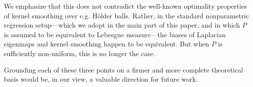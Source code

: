 \begin{itemize}
	We emphasize that this does not contradict the well-known optimality properties of kernel smoothing over e.g. H\"{o}lder balls. Rather, in the standard nonparametric regression setup---which we adopt in the main part of this paper, and in which $P$ is assumed to be equivalent to Lebesgue measure---the biases of Laplacian eigenmaps and kernel smoothing happen to be equivalent. But when $P$ is sufficiently non-uniform, this is no longer the case.
\end{itemize}
Grounding each of these three points on a firmer and more complete theoretical basis would be, in our view, a valuable direction for future work.